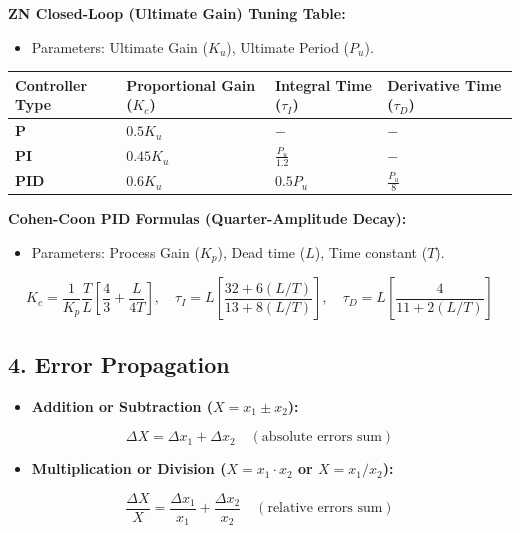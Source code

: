 \textbf{ZN Closed-Loop (Ultimate Gain) Tuning Table:}
\begin{itemize}
  \item Parameters: Ultimate Gain ($K_u$), Ultimate Period ($P_u$).
\end{itemize}
\begin{table}[H]
\centering
\begin{tabular}{|p{}|p{}|p{}|p{}|}
\hline
Controller Type & Proportional Gain ($K_c$) & Integral Time ($\tau_I$) & Derivative Time ($\tau_D$) \\
\hline
\textbf{P} & $0.5 K_u$ & $-$ & $-$ \\
\hline
\textbf{PI} & $0.45 K_u$ & $\frac{P_u}{1.2}$ & $-$ \\
\hline
\textbf{PID} & $0.6 K_u$ & $0.5 P_u$ & $\frac{P_u}{8}$ \\
\hline
\end{tabular}
\end{table}

\textbf{Cohen-Coon PID Formulas (Quarter-Amplitude Decay):}
\begin{itemize}
  \item Parameters: Process Gain ($K_p$), Dead time ($L$), Time constant ($T$).
\end{itemize}
\[ K_c = \frac{1}{K_p} \frac{T}{L} \left[ \frac{4}{3} + \frac{L}{4T} \right], \quad \tau_I = L \left[ \frac{32 + 6(L/T)}{13 + 8(L/T)} \right], \quad \tau_D = L \left[ \frac{4}{11 + 2(L/T)} \right] \]

\subsection{4. Error Propagation}
\begin{itemize}
  \item \textbf{Addition or Subtraction ($X = x_1 \pm x_2$):}
\end{itemize}
  \[ \Delta X = \Delta x_1 + \Delta x_2 \quad (\text{absolute errors sum}) \]
\begin{itemize}
  \item \textbf{Multiplication or Division ($X = x_1 \cdot x_2$ or $X = x_1 / x_2$):}
\end{itemize}
  \[ \frac{\Delta X}{X} = \frac{\Delta x_1}{x_1} + \frac{\Delta x_2}{x_2} \quad (\text{relative errors sum}) \]


